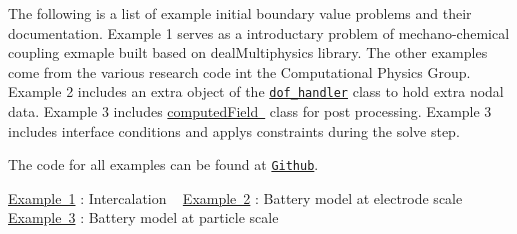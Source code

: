 The following is a list of example initial boundary value problems and their documentation. Example 1 serves as a introductary problem of mechano-\/chemical coupling exmaple built based on deal\+Multiphysics library. The other examples come from the various research code int the Computational Physics Group. Example 2 includes an extra object of the \href{https://www.dealii.org/8.5.0/doxygen/deal.II/classDoFHandler.html}{\tt dof\+\_\+handler} class to hold extra nodal data. Example 3 includes \mbox{\hyperlink{classcomputed_field}{computed\+Field }} class for post processing. Example 3 includes interface conditions and applys constraints during the solve step.

The code for all examples can be found at \href{https://github.com/mechanoChem/mechanoChemFEM/tree/example}{\tt Github}.

\mbox{\hyperlink{_intercalation}{Example 1}} \+: Intercalation ~\newline
 \mbox{\hyperlink{battery_electrode_scale}{Example 2}} \+: Battery model at electrode scale~\newline
 \mbox{\hyperlink{battery_particle}{Example 3}} \+: Battery model at particle scale~\newline
